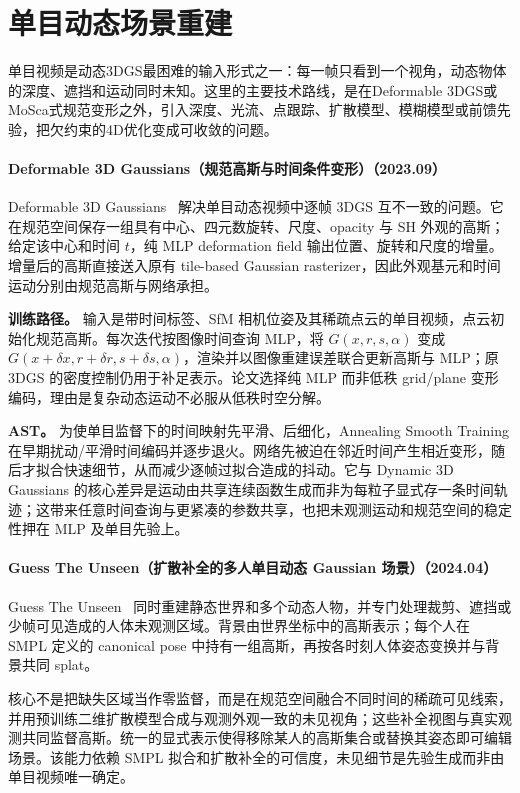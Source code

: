 \section{单目动态场景重建}

单目视频是动态3DGS最困难的输入形式之一：每一帧只看到一个视角，动态物体的深度、遮挡和运动同时未知。这里的主要技术路线，是在Deformable 3DGS或MoSca式规范变形之外，引入深度、光流、点跟踪、扩散模型、模糊模型或前馈先验，把欠约束的4D优化变成可收敛的问题。
\paragraph{Deformable 3D Gaussians（规范高斯与时间条件变形）（2023.09）}
Deformable 3D Gaussians~\cite{2309_13101} 解决单目动态视频中逐帧 3DGS 互不一致的问题。它在规范空间保存一组具有中心、四元数旋转、尺度、opacity 与 SH 外观的高斯；给定该中心和时间 $t$，纯 MLP deformation field 输出位置、旋转和尺度的增量。增量后的高斯直接送入原有 tile-based Gaussian rasterizer，因此外观基元和时间运动分别由规范高斯与网络承担。

\textbf{训练路径。} 输入是带时间标签、SfM 相机位姿及其稀疏点云的单目视频，点云初始化规范高斯。每次迭代按图像时间查询 MLP，将 $G(x,r,s,\alpha)$ 变成 $G(x+\delta x,r+\delta r,s+\delta s,\alpha)$，渲染并以图像重建误差联合更新高斯与 MLP；原 3DGS 的密度控制仍用于补足表示。论文选择纯 MLP 而非低秩 grid/plane 变形编码，理由是复杂动态运动不必服从低秩时空分解。

\textbf{AST。} 为使单目监督下的时间映射先平滑、后细化，Annealing Smooth Training 在早期扰动/平滑时间编码并逐步退火。网络先被迫在邻近时间产生相近变形，随后才拟合快速细节，从而减少逐帧过拟合造成的抖动。它与 Dynamic 3D Gaussians 的核心差异是运动由共享连续函数生成而非为每粒子显式存一条时间轨迹；这带来任意时间查询与更紧凑的参数共享，也把未观测运动和规范空间的稳定性押在 MLP 及单目先验上。

\paragraph{Guess The Unseen（扩散补全的多人单目动态 Gaussian 场景）（2024.04）}
Guess The Unseen~\cite{2404_14410} 同时重建静态世界和多个动态人物，并专门处理裁剪、遮挡或少帧可见造成的人体未观测区域。背景由世界坐标中的高斯表示；每个人在 SMPL 定义的 canonical pose 中持有一组高斯，再按各时刻人体姿态变换并与背景共同 splat。

核心不是把缺失区域当作零监督，而是在规范空间融合不同时间的稀疏可见线索，并用预训练二维扩散模型合成与观测外观一致的未见视角；这些补全视图与真实观测共同监督高斯。统一的显式表示使得移除某人的高斯集合或替换其姿态即可编辑场景。该能力依赖 SMPL 拟合和扩散补全的可信度，未见细节是先验生成而非由单目视频唯一确定。

